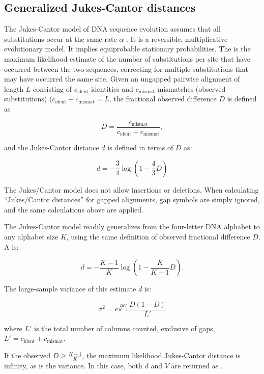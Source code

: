 \subsection{Generalized Jukes-Cantor distances}

The Jukes-Cantor model of DNA sequence evolution assumes that all
substitutions occur at the same rate $\alpha$
\citep{JukesCantor69}. It is a reversible, multiplicative evolutionary
model. It implies equiprobable stationary probabilities. The
 is the maximum likelihood estimate of
the number of substitutions per site that have occurred between the
two sequences, correcting for multiple substitutions that may have
occurred the same site. Given an ungapped pairwise alignment of length
$L$ consisting of $c_{\mbox{ident}}$ identities and
$c_{\mbox{mismat}}$ mismatches (observed substitutions)
($c_{\mbox{ident}} + c_{\mbox{mismat}} = L$, the fractional observed
difference $D$ is defined as

\[
  D = \frac{c_{\mbox{mismat}}}{c_{\mbox{ident}} + c_{\mbox{mismat}}},
\]

and the Jukes-Cantor distance $d$ is defined in terms of $D$ as:

\[
  d = -\frac{3}{4} \log \left( 1 - \frac{4}{3} D \right)
\]

The Jukes/Cantor model does not allow insertions or deletions.  When
calculating ``Jukes/Cantor distances'' for gapped alignments, gap
symbols are simply ignored, and the same calculations above are
applied.

The Jukes-Cantor model readily generalizes from the four-letter DNA
alphabet to any alphabet size $K$, using the same definition of
observed fractional difference $D$. A  is:

\[
  d = -\frac{K-1}{K} \log \left( 1 - \frac{K}{K-1} D \right).
\]

The large-sample variance of this estimate $d$ is:

\[
   \sigma^2 = e^\frac{2Kd}{K-1} \frac{D(1-D)}{L'}
\]

where $L'$ is the total number of columns counted, exclusive of gaps,
$L' = c_{\mbox{ident}} + c_{\mbox{mismat}}$.

If the observed $D \geq \frac{K-1}{K}$, the maximum likelihood
Jukes-Cantor distance is infinity, as is the variance. In this case,
both $d$ and $V$ are returned as . 


